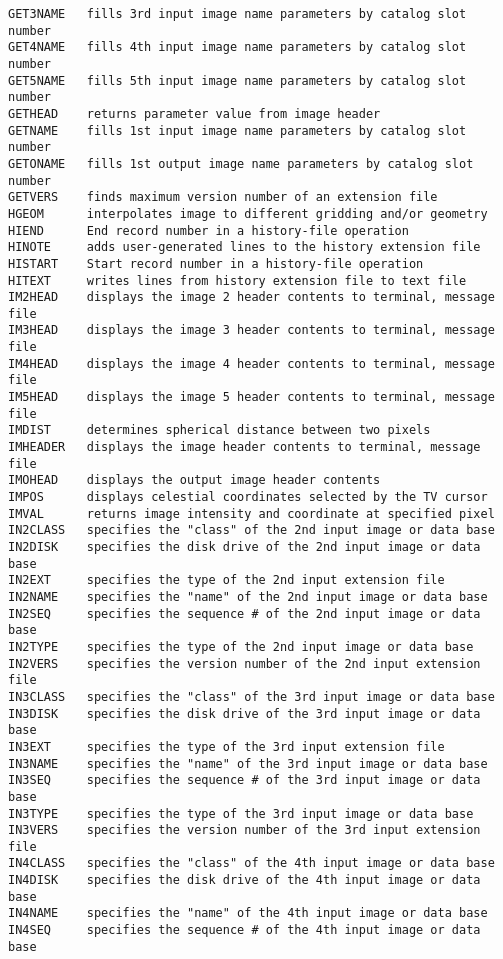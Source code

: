 \begin{verbatim}
GET3NAME   fills 3rd input image name parameters by catalog slot number
GET4NAME   fills 4th input image name parameters by catalog slot number
GET5NAME   fills 5th input image name parameters by catalog slot number
GETHEAD    returns parameter value from image header
GETNAME    fills 1st input image name parameters by catalog slot number
GETONAME   fills 1st output image name parameters by catalog slot number
GETVERS    finds maximum version number of an extension file
HGEOM      interpolates image to different gridding and/or geometry
HIEND      End record number in a history-file operation
HINOTE     adds user-generated lines to the history extension file
HISTART    Start record number in a history-file operation
HITEXT     writes lines from history extension file to text file
IM2HEAD    displays the image 2 header contents to terminal, message file
IM3HEAD    displays the image 3 header contents to terminal, message file
IM4HEAD    displays the image 4 header contents to terminal, message file
IM5HEAD    displays the image 5 header contents to terminal, message file
IMDIST     determines spherical distance between two pixels
IMHEADER   displays the image header contents to terminal, message file
IMOHEAD    displays the output image header contents
IMPOS      displays celestial coordinates selected by the TV cursor
IMVAL      returns image intensity and coordinate at specified pixel
IN2CLASS   specifies the "class" of the 2nd input image or data base
IN2DISK    specifies the disk drive of the 2nd input image or data base
IN2EXT     specifies the type of the 2nd input extension file
IN2NAME    specifies the "name" of the 2nd input image or data base
IN2SEQ     specifies the sequence # of the 2nd input image or data base
IN2TYPE    specifies the type of the 2nd input image or data base
IN2VERS    specifies the version number of the 2nd input extension file
IN3CLASS   specifies the "class" of the 3rd input image or data base
IN3DISK    specifies the disk drive of the 3rd input image or data base
IN3EXT     specifies the type of the 3rd input extension file
IN3NAME    specifies the "name" of the 3rd input image or data base
IN3SEQ     specifies the sequence # of the 3rd input image or data base
IN3TYPE    specifies the type of the 3rd input image or data base
IN3VERS    specifies the version number of the 3rd input extension file
IN4CLASS   specifies the "class" of the 4th input image or data base
IN4DISK    specifies the disk drive of the 4th input image or data base
IN4NAME    specifies the "name" of the 4th input image or data base
IN4SEQ     specifies the sequence # of the 4th input image or data base

\end{verbatim}

